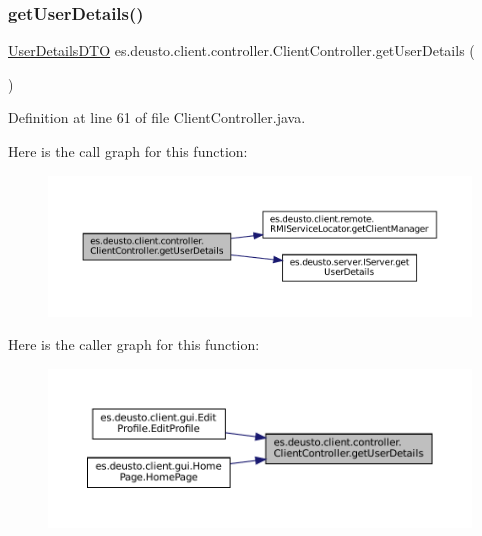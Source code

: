 \subsubsection{\texorpdfstring{getUserDetails()}{getUserDetails()}}
{\footnotesize\ttfamily \mbox{\hyperlink{classes_1_1deusto_1_1server_1_1data_1_1_user_details_d_t_o}{User\+Details\+D\+TO}} es.\+deusto.\+client.\+controller.\+Client\+Controller.\+get\+User\+Details (\begin{DoxyParamCaption}{ }\end{DoxyParamCaption})}



Definition at line 61 of file Client\+Controller.\+java.

Here is the call graph for this function\+:
\nopagebreak
\begin{figure}[H]
\begin{center}
\leavevmode
\includegraphics[width=350pt]{classes_1_1deusto_1_1client_1_1controller_1_1_client_controller_ac1bd9affe27668ee49320daae38d67a0_cgraph}
\end{center}
\end{figure}
Here is the caller graph for this function\+:
\nopagebreak
\begin{figure}[H]
\begin{center}
\leavevmode
\includegraphics[width=350pt]{classes_1_1deusto_1_1client_1_1controller_1_1_client_controller_ac1bd9affe27668ee49320daae38d67a0_icgraph}
\end{center}
\end{figure}
\mbox{\label{classes_1_1deusto_1_1client_1_1controller_1_1_client_controller_a075c2e627be920454324dacbbc72295c}} 
